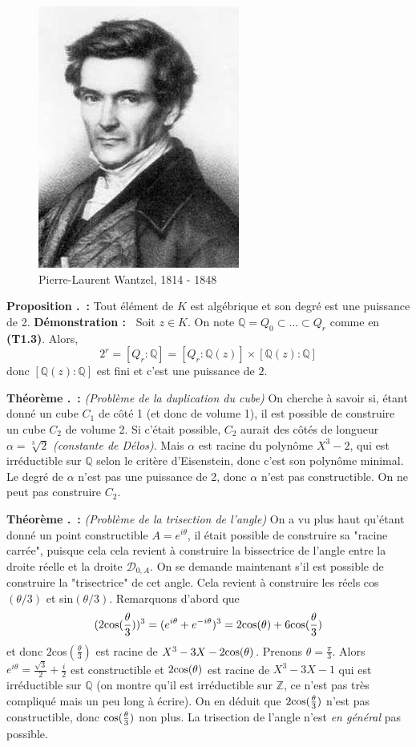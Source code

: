 \documentclass[5pt,a4paper]{article}
\newcounter{prop}[section]
\newcounter{thm}[section]
\renewcommand{\theprop}{\thesection.\arabic{prop}}
\renewcommand{\thethm}{\thesection.\arabic{thm}}
\newcommand{\prop}[1]{\stepcounter{prop}\noindent\textbf{Proposition \theprop ~:} #1 \newline}
\newcommand{\thm}[1]{\stepcounter{thm}\noindent\textbf{Théorème \thethm ~:} #1 \newline}
\newcommand{\demo}[1]{\textbf{Démonstration :~} #1 \newline}
\begin{document}
\begin{onehalfspacing}
\begin{figure}[!h]
\centering
\includegraphics[width = 0.33\linewidth]{ressources/wantzel.jpg}
\caption{Pierre-Laurent Wantzel, 1814 - 1848}
\end{figure}

\prop{Tout élément de $K$ est algébrique et son degré est une puissance de 2.}
\demo{Soit $z \in K$. On note $\mathbb{Q} = Q_0 \subset ... \subset Q_r$ comme en \textbf{(T1.3)}. Alors, 
\[2^r = [Q_r : \mathbb{Q}] = [Q_r : \mathbb{Q}(z)]\times[\mathbb{Q}(z) : \mathbb{Q}]\]
donc $[\mathbb{Q}(z) : \mathbb{Q}]$ est fini et c'est une puissance de $2$.}

\thm{\textit{(Problème de la duplication du cube)} On cherche à savoir si, étant donné un cube $C_1$ de côté 1 (et donc de volume 1), il est possible de construire un cube $C_2$ de volume 2. Si c'était possible, $C_2$ aurait des côtés de longueur $\alpha = \sqrt[3]{2}$ \textit{(constante de Délos)}. Mais $\alpha$ est racine du polynôme $X^3 - 2$, qui est irréductible sur $\mathbb{Q}$ selon le critère d'Eisenstein, donc c'est son polynôme minimal. Le degré de $\alpha$ n'est pas une puissance de 2, donc $\alpha$ n'est pas constructible. On ne peut pas construire $C_2$.}

\thm{\textit{(Problème de la trisection de l'angle)} On a vu plus haut qu'étant donné un point constructible $A = e^{i\theta}$, il était possible de construire sa "racine carrée", puisque cela cela revient à construire la bissectrice de l'angle entre la droite réelle et la droite $\mathcal{D}_{0, A}$. On se demande maintenant s'il est possible de construire la "trisectrice" de cet angle. Cela revient à construire les réels cos$(\theta/3)$ et sin$(\theta/3)$. Remarquons d'abord que 
\[(2\textup{cos}(\frac{\theta}{3}))^3 = (e^{i\theta} + e^{-i\theta})^3 = 2\textup{cos}(\theta) + 6\textup{cos}(\frac{\theta}{3})\]
et donc $2$cos$(\frac{\theta}{3})$ est racine de $X^3 - 3X - 2\textup{cos}(\theta)$.
Prenons $\theta = \frac{\pi}{3}$. Alors $e^{i\theta} = \frac{\sqrt{3}}{2} + \frac{i}{2}$ est constructible et $2\textup{cos}(\theta)$ est racine de $X^3 - 3X - 1$ qui est irréductible sur $\mathbb{Q}$ (on montre qu'il est irréductible sur $\mathbb{Z}$, ce n'est pas très compliqué mais un peu long à écrire). On en déduit que $2\textup{cos}(\frac{\theta}{3})$ n'est pas constructible, donc $\textup{cos}(\frac{\theta}{3})$ non plus. La trisection de l'angle n'est \textit{en général} pas possible.}



\end{onehalfspacing}
\end{document}
